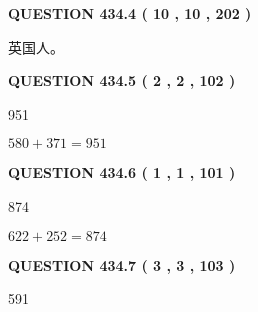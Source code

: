 \documentclass{ctexart}
\begin{document}
 
  
\vspace{0.2in}
  
{\textbf{\Large{QUESTION
434.4 
 ( 10 , 10 , 202 )
}}}
  
  
 
 
\noindent{}
 
 
英国人。
 
 
 
 
  
\vspace{0.2in}
  
{\textbf{\Large{QUESTION
434.5 
 ( 2 , 2 , 102 )
}}}
  
  
 
 
\noindent{}

951
 
 
 
 
\noindent{}

$ %
580 +  %
371=   %
951$
 
 
  
\vspace{0.2in}
  
{\textbf{\Large{QUESTION
434.6 
 ( 1 , 1 , 101 )
}}}
  
  
 
 
\noindent{}

874
 
 
 
 
\noindent{}

$ %
622 +  %
252=   %
874$
 
 
  
\vspace{0.2in}
  
{\textbf{\Large{QUESTION
434.7 
 ( 3 , 3 , 103 )
}}}
  
  
 
 
\noindent{}

591
 
 
 
 
\noindent{}
\end{document}
